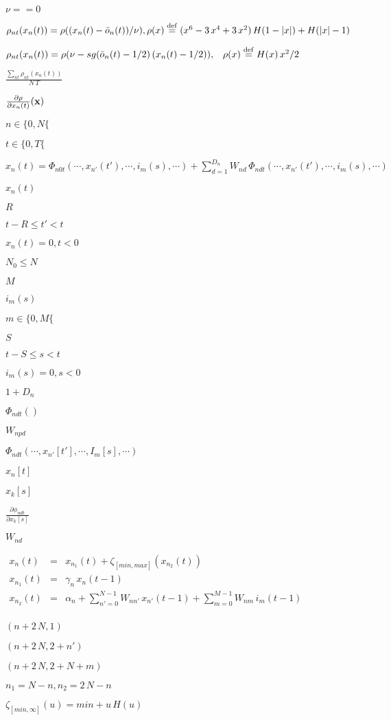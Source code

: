 \documentclass{article}
\begin{document}
$\nu == 0$
\pagebreak

$\rho_{nt}(x_n(t)) = \rho((x_n(t)-\bar{o}_n(t))/\nu), \rho(x) \stackrel{\rm def}{=} (x^6 - 3 \, x^4 + 3 \, x^2) \, H(1 - |x|) + H(|x| - 1)$
\pagebreak

$\rho_{nt}(x_n(t)) = \rho(\nu - sg(\bar{o}_n(t) - 1/2) \, (x_n(t) - 1/2)), \;\;\; \rho(x) \stackrel{\rm def}{=} H(x) \, x^2/2$
\pagebreak

$\frac{\sum_{nt} \rho_{nt}(x_n(t))}{N\,T}$
\pagebreak

$\frac{\partial \rho}{\partial x_n(t)}({\bf x})$
\pagebreak

$n \in \{0, N\{$
\pagebreak

$t \in \{0, T\{$
\pagebreak

$x_n(t) = \Phi_{n0t}\left(\cdots, x_{n'}(t'), \cdots, i_{m}(s), \cdots\right) + \sum_{d = 1}^{D_{n}} W_{nd} \, \Phi_{ndt}\left(\cdots, x_{n'}(t'), \cdots, i_{m}(s), \cdots\right)$
\pagebreak

$x_{n}(t)$
\pagebreak

$R$
\pagebreak

$t - R \leq t' < t$
\pagebreak

$x_{n}(t) = 0, t < 0$
\pagebreak

$N_0 \leq N$
\pagebreak

$M$
\pagebreak

$i_{m}(s)$
\pagebreak

$m \in \{0, M\{$
\pagebreak

$S$
\pagebreak

$t - S \leq s < t$
\pagebreak

$i_{m}(s) = 0, s < 0$
\pagebreak

$1 + D_{n}$
\pagebreak

$\Phi_{ndt}\left(\right)$
\pagebreak

$W_{npd}$
\pagebreak

$\Phi_{ndt}\left(\cdots, x_{n'}[t'], \cdots, I_{m}[s], \cdots\right)$
\pagebreak

$x_n[t]$
\pagebreak

$x_k[s]$
\pagebreak

$\frac{\partial \phi_{ndt}}{\partial x_k[s]}$
\pagebreak

$W_{nd}$
\pagebreak

$\begin{array}{rcl} x_n(t) &=& x_{n_1}(t) + \zeta_{[min,max]}\left(x_{n_2}(t)\right) \\ x_{n_1}(t) &=& \gamma_n \, x_{n}(t-1) \\ x_{n_2}(t) &=& \alpha_n + \sum_{n' = 0}^{N-1} W_{nn'} \, x_{n'}(t-1) + \sum_{m = 0}^{M-1} W_{nm} \, i_m(t-1) \\ \end{array}$
\pagebreak

$(n+2\,N,1)$
\pagebreak

$(n+2\,N,2+n')$
\pagebreak

$(n+2\,N,2+N+m)$
\pagebreak

$n_1 = N - n, n_2 = 2\,N - n$
\pagebreak

$\zeta_{[min,\infty]}\left(u\right) = min + u \, H(u)$
\pagebreak
\end{document}

